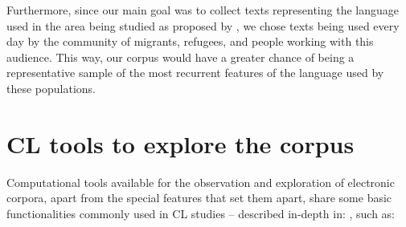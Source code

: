 \documentclass[english]{textolivre}
\begin{document}
Furthermore, since our main goal was to collect texts representing the language used in the area being studied as proposed by \textcite{tagnin_translator-oriented_2012}, we chose texts being used every day by the community of migrants, refugees, and people working with this audience. This way, our corpus would have a greater chance of being a representative sample of the most recurrent features of the language used by these populations.

\section{CL tools to explore the corpus}\label{sec-organizacao}

Computational tools available for the observation and exploration of electronic corpora, apart from the special features that set them apart, share some basic functionalities commonly used in CL studies -- described in-depth in: \textcite{fromm_wordsmith_2020,rodriguez_martinez_extraccion_2021}, such as:
\end{document}
